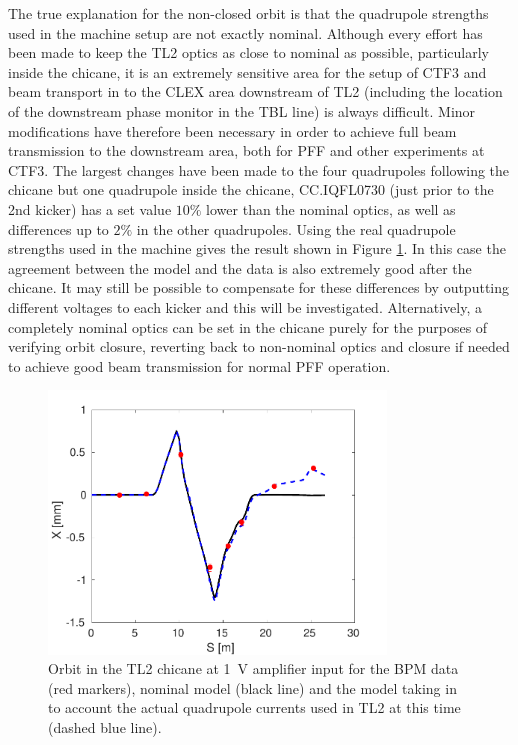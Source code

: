 The true explanation for the non-closed orbit is that the quadrupole strengths used in the machine setup are not exactly nominal. Although every effort has been made to keep the TL2 optics as close to nominal as possible, particularly inside the chicane, it is an extremely sensitive area for the setup of CTF3 and beam transport in to the CLEX area downstream of TL2 (including the location of the downstream phase monitor in the TBL line) is always difficult. Minor modifications have therefore been necessary in order to achieve full beam transmission to the downstream area, both for PFF and other experiments at CTF3. The largest changes have been made to the four quadrupoles following the chicane but one quadrupole inside the chicane, CC.IQFL0730 (just prior to the 2nd kicker) has a set value \(10\%\) lower than the nominal optics, as well as differences up to \(2\%\) in the other quadrupoles. Using the real quadrupole strengths used in the machine gives the result shown in Figure \ref{f:orbClosureVsQuadModel}. In this case the agreement between the model and the data is also extremely good after the chicane. It may still be possible to compensate for these differences by outputting different voltages to each kicker and this will be investigated. Alternatively, a completely nominal optics can be set in the chicane purely for the purposes of verifying orbit closure, reverting back to non-nominal optics and closure if needed to achieve good beam transmission for normal PFF operation.

\begin{figure}
  \centering
  \includegraphics[width=0.8\textwidth]{Figures/commissioning/orbClosureVsQuadModel}
  \caption{Orbit in the TL2 chicane at 1~V amplifier input for the BPM data (red markers), nominal model (black line) and the model taking in to account the actual quadrupole currents used in TL2 at this time (dashed blue line).}
  \label{f:orbClosureVsQuadModel}
\end{figure}

